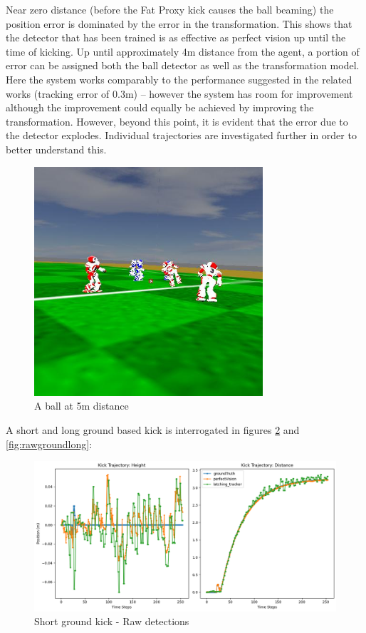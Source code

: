 \documentclass[a4paper,twoside,12pt]{report}
\begin{document}
Near zero distance (before the Fat Proxy kick causes the ball beaming) the position error is dominated by the error in the transformation. This shows that the detector that has been trained is as effective as perfect vision up until the time of kicking. Up until approximately 4m distance from the agent, a portion of error can be assigned both the ball detector as well as the transformation model. Here the system works comparably to the performance suggested in the related works (tracking error of 0.3m) -- however the system has room for improvement although the improvement could equally be achieved by improving the transformation. However, beyond this point, it is evident that the error due to the detector explodes. Individual trajectories are investigated further in order to better understand this.

\begin{figure}[h!]
\begin{center}
\includegraphics[width=8.5cm]{images/5mball.jpeg}
\caption{A ball at 5m distance}
\label{fig:farball}
\end{center}
\end{figure}

A short and long ground based kick is interrogated in figures \ref{fig:rawgroundshort} and \ref{fig:rawgroundlong}:

\begin{figure}[h!]
\begin{center}
\includegraphics[width=14cm]{images/raw_ground_short.png}
\caption{Short ground kick - Raw detections}
\label{fig:rawgroundshort}
\end{center}
\end{figure}
\end{document}
